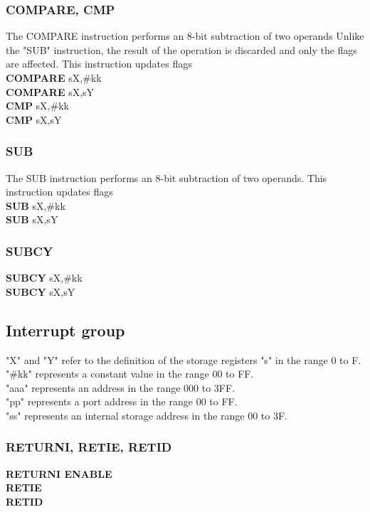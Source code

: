         \subsubsection{COMPARE, CMP}
            The COMPARE instruction performs an 8-bit subtraction of two operands Unlike the "SUB" instruction, the result of the operation is
            discarded and only the flags are affected. This instruction updates flags\\
            \textbf{COMPARE} sX,\#kk\\
            \textbf{COMPARE} sX,sY\\
            \textbf{CMP}     sX,\#kk\\
            \textbf{CMP}     sX,sY\\

        \subsubsection{SUB}
            The SUB instruction performs an 8-bit subtraction of two operands. This instruction updates flags\\
            \textbf{SUB} sX,\#kk\\
            \textbf{SUB} sX,sY\\
        \subsubsection{SUBCY}
            \textbf{SUBCY} sX,\#kk\\
            \textbf{SUBCY} sX,sY\\

        \subsection{Interrupt group}
            "X" and "Y" refer to the definition of the storage registers "s" in the range 0 to F.\\
            "\#kk" represents a constant value in the range 00 to FF.\\
            "aaa" represents an address in the range 000 to 3FF.\\
            "pp" represents a port address in the range 00 to FF.\\
            "ss" represents an internal storage address in the range 00 to 3F.\\
        \subsubsection{RETURNI, RETIE, RETID}
            \textbf{RETURNI ENABLE}\\
            \textbf{RETIE}\\
            \textbf{RETID}\\
